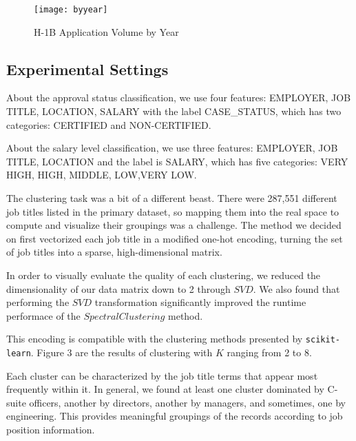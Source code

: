 \documentclass[sigconf]{acmart}
\begin{document}
\begin{figure}[h]
  \centering
  \texttt{[image: byyear]}
  \caption{H-1B Application Volume by Year}
\end{figure}


\subsection{Experimental Settings}
About the approval status classification, we use four features: EMPLOYER, JOB TITLE, LOCATION,
SALARY with the label CASE\_STATUS, which has two categories: CERTIFIED and NON-CERTIFIED.

About the salary level classification, we use three features: EMPLOYER, JOB TITLE, LOCATION and the
label is SALARY, which has five categories: VERY HIGH, HIGH, MIDDLE, LOW,VERY LOW.

The clustering task was a bit of a different beast. There were 287,551 different job titles listed
in the primary dataset, so mapping them into the real space to compute and visualize their groupings
was a challenge. The method we decided on first vectorized each job title in a modified one-hot
encoding, turning the set of job titles into a sparse, high-dimensional matrix.

In order to visually evaluate the quality of each clustering, we reduced the dimensionality of our
data matrix down to 2 through $SVD$. We also found that performing the $SVD$ transformation
significantly improved the runtime performace of the $SpectralClustering$ method.

This encoding is compatible with the clustering methods presented by \texttt{scikit-learn}. Figure 3
are the results of clustering with $K$ ranging from 2 to 8.

Each cluster can be characterized by the job title terms that appear most frequently within it. In
general, we found at least one cluster dominated by C-suite officers, another by directors, another
by managers, and sometimes, one by engineering. This provides meaningful groupings of the records
according to job position information.
\end{document}
